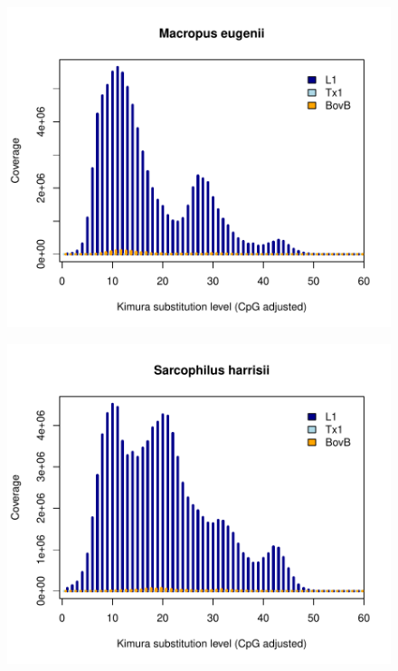 \documentclass[12pt,a4paper,times]{article}
\begin{document}
\begin{figure}[H]
	\centering
	\includegraphics[scale=0.8]{suppFigures/divergencePlots/Macropus_eugenii.pdf}
	\caption{\label{Macropus_eugenii}}
\end{figure}

\begin{figure}[H]
	\centering
	\includegraphics[scale=0.8]{suppFigures/divergencePlots/Sarcophilus_harrisii.pdf}
	\caption{\label{Sarcophilus_harrisii}}
\end{figure}
\end{document}
